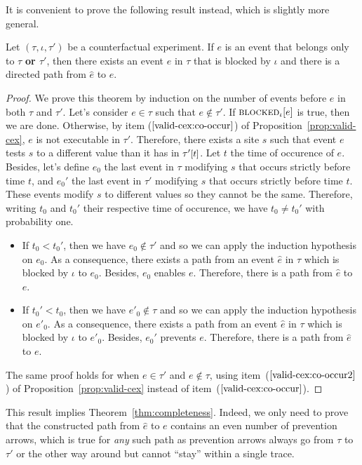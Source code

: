 It is convenient to prove the following result instead, which is
slightly more general.
\begin{theorem*} Let $(\tau, \iota, \tau')$ be a counterfactual
  experiment. If $e$ is an event that belongs only to $\tau$
  \textbf{or $\tau'$}, then there exists an event $\hat e$ in
  $\tau$ that is blocked by $\iota$ and there is a directed path 
  from $\hat e$ to $e$.
\end{theorem*}
\begin{proof}
  We prove this theorem by induction on the number of events before
  $e$ in both $\tau$ and $\tau'$. Let's consider $e \in \tau$ such
  that $e \notin \tau'$. If ${\textsc{blocked}}_{\iota}[e]$ is true, then we are
  done. Otherwise, by item ($\ref{valid-cex:co-occur}$) of
  Proposition~\ref{prop:valid-cex}, $e$ is not executable in
  $\tau'$. Therefore, there exists a site $s$ such that event $e$
  tests $s$ to a different value than it has in $\TSTATE{t}{\tau'}$.
  Let $t$ the time of occurence of $e$.  Besides, let's define $e_0$
  the last event in $\tau$ modifying $s$ that occurs strictly before
  time $t$, and $e_0'$ the last event in $\tau'$ modifying $s$ that
  occurs strictly before time $t$. These events modify $s$ to
  different values so they cannot be the same. Therefore, writing
  $t_0$ and $t_0'$ their respective time of occurence, we have
  $t_0 \neq t_0'$ with probability one.

  \begin{itemize}
  \item If $t_0 < t_0'$, then we have $e_0 \notin \tau'$
    and so we can apply the induction hypothesis on $e_0$. As a
    consequence, there exists a path from an event $\hat e$ in $\tau$
    which is blocked by $\iota$ to $e_0$. Besides, $e_0$ enables
    $e$. Therefore, there is a path from $\hat e$ to $e$.
  \item If $t_0' < t_0$, then we have $e'_0 \notin \tau$
    and so we can apply the induction hypothesis on $e'_0$. As a
    consequence, there exists a path from an event $\hat e$ in $\tau$
    which is blocked by $\iota$ to $e'_0$. Besides, $e_0'$ prevents
    $e$. Therefore, there is a path from $\hat e$ to $e$.
  \end{itemize}
  The same proof holds for when $e \in \tau'$ and $e \notin \tau$,
  using item~($\ref{valid-cex:co-occur2}$) of
  Proposition~\ref{prop:valid-cex} instead of
  item~($\ref{valid-cex:co-occur}$).
\end{proof}
This result implies Theorem~\ref{thm:completeness}. Indeed, we only
need to prove that the constructed path from $\hat e$ to $e$ contains
an even number of prevention arrows, which is true for \textit{any}
such path as prevention arrows always go from $\tau$ to $\tau'$ or the
other way around but cannot ``stay'' within a single trace.
